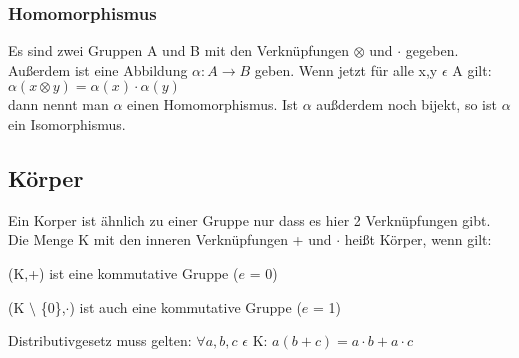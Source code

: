\documentclass[a4paper,10pt]{scrartcl}
\begin{document}
            \subsubsection{Homomorphismus}
                Es sind zwei Gruppen A und B mit den Verknüpfungen $\otimes$ und $\cdot$ gegeben. \\
                Außerdem ist eine Abbildung $\alpha: A \rightarrow B$ geben. Wenn jetzt für alle x,y $\epsilon$ A gilt:\\
                $\alpha(x \otimes y) = \alpha(x) \cdot \alpha(y)$\\
                dann nennt man $\alpha$ einen Homomorphismus. Ist $\alpha$ außderdem noch bijekt, so ist $\alpha$ ein Isomorphismus.  
        \subsection{Körper}
            Ein Korper ist ähnlich zu einer Gruppe nur dass es hier 2 Verknüpfungen gibt. Die Menge K mit den inneren Verknüpfungen + und $\cdot$ heißt Körper, wenn gilt:
            \begin{description}
                \item (K,+) ist eine kommutative Gruppe ($e$ = 0)
                \item (K $\setminus$ \{0\},$\cdot$) ist auch eine kommutative Gruppe ($e$ = 1)
                \item Distributivgesetz muss gelten: $\forall a,b,c$ $\epsilon$ K: $a(b + c) = a \cdot b + a \cdot c$
            \end{description}
            \newpage
\end{document}
